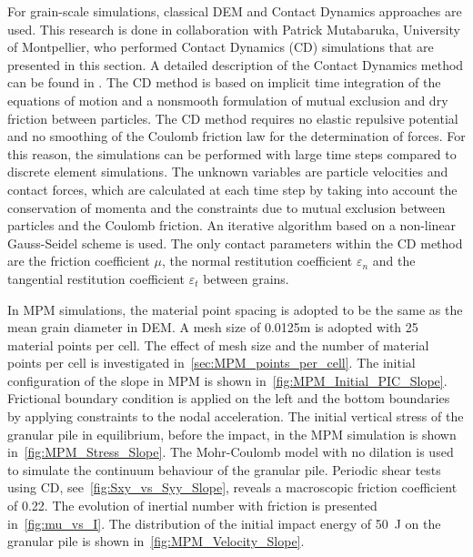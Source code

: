 For grain-scale simulations, classical DEM and Contact Dynamics approaches are 
used. This research is done in collaboration with Patrick Mutabaruka, 
University of Montpellier, who performed Contact Dynamics (CD) simulations that 
are 
presented in this section. A detailed description of the Contact Dynamics 
method can be found in \cite{Moreau1993,Jean1999,Radjai2009,Radjai2011}. 
The CD method is based on implicit time integration of the equations of motion 
and a nonsmooth formulation of mutual exclusion and dry friction between 
particles. The CD method requires no elastic repulsive potential and no 
smoothing of the Coulomb friction law for the determination of forces. 
For this reason, the simulations can be performed with large time steps 
compared to discrete element simulations. The unknown variables are particle 
velocities and contact forces, which are calculated at each time step by taking 
into account the conservation of momenta and the constraints due to mutual 
exclusion between particles and the Coulomb friction. An iterative 
algorithm based on a non-linear Gauss-Seidel scheme is used. The only 
contact 
parameters within the CD method are the friction coefficient $\mu$, the 
normal restitution coefficient $\varepsilon_n$ and the tangential restitution 
coefficient $\varepsilon_t$ between grains. 

In MPM simulations, the material point spacing is adopted to be the same as the 
mean grain diameter in DEM. A mesh size of 0.0125m is adopted with 25 material 
points per cell. The effect of mesh size and the number of material points per 
cell is investigated in~\cref{sec:MPM_points_per_cell}. The initial 
configuration of the slope in MPM is shown in~\cref{fig:MPM_Initial_PIC_Slope}. 
Frictional boundary condition is applied on the left and the bottom boundaries 
by applying constraints to the nodal acceleration. The initial vertical stress 
of the granular pile in equilibrium, before the impact, in the MPM simulation 
is shown in~\cref{fig:MPM_Stress_Slope}. The Mohr-Coulomb model 
with no dilation is used to simulate the continuum behaviour of the granular 
pile. Periodic shear tests using CD, see~\cref{fig:Sxy_vs_Syy_Slope}, reveals a 
macroscopic friction coefficient of 0.22. The evolution of inertial number with 
friction is presented in~\cref{fig:mu_vs_I}. The distribution of the initial 
impact energy of 50~\si{J} on the granular pile is shown 
in~\cref{fig:MPM_Velocity_Slope}.


